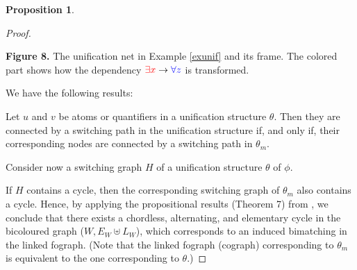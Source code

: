 \documentclass{article}
\theoremstyle{definition}
\newtheorem{proposition}[thm]{Proposition}
\begin{document}
\begin{proposition}
\begin{proof}
\begin{center}
{
}

{\bf Figure 8.} The unification net in Example \ref{exunif} and its frame. The colored part shows how the dependency ${\color{red} \exists x} \rightarrow {\color{blue} \forall z}$ is transformed.
\end{center}

We have the following results: 

Let $u$ and $v$ be atoms or quantifiers in a unification structure $\theta$. Then they are connected by a switching path in the unification structure if, and only if, their corresponding nodes are connected by a switching path in $\theta_m$.

Consider now a switching graph $H$ of a unification structure $\theta$ of $\phi$.

If $H$ contains a cycle, then the corresponding switching graph of $\theta_m$ also contains a cycle. Hence, by applying the propositional results (Theorem 7) from \cite{Retore 2003}, we conclude that there exists a chordless, alternating, and elementary cycle in the bicoloured graph ($W, E_W \uplus L_W$), which corresponds to an induced bimatching in the linked fograph. (Note that the linked fograph (cograph) corresponding to $\theta_m$ is equivalent to the one corresponding to $\theta$.)



\end{proof}
\end{proposition}
\end{document}
